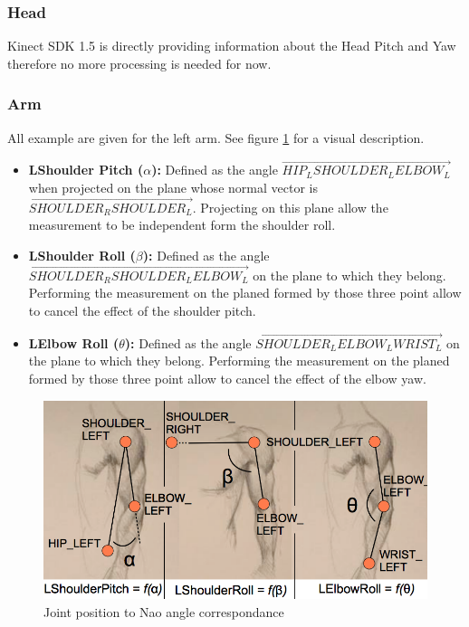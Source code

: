 \documentclass[a4paper,11pt]{article}
\begin{document}
\subsubsection*{Head}

Kinect SDK 1.5 is directly providing information about the Head Pitch and Yaw therefore no more processing is needed for now.

\subsubsection*{Arm}

All example are given for the left arm. See figure \ref{kinecttonao} for a visual description.

\begin{itemize}
\item \textbf{LShoulder Pitch ($\alpha$):} Defined as the angle $\vec{HIP_L SHOULDER_L ELBOW_L}$ when projected on the plane whose normal vector is $\vec{SHOULDER_R SHOULDER_L}$. Projecting on this plane allow the measurement to be independent form the shoulder roll.

\item \textbf{LShoulder Roll ($\beta$):} Defined as the angle $\vec{SHOULDER_R SHOULDER_L ELBOW_L}$ on the plane to which they belong. Performing the measurement on the planed formed by those three point allow to cancel the effect of the shoulder pitch.

\item \textbf{LElbow Roll ($\theta$):} Defined as the angle $\vec{SHOULDER_L ELBOW_L WRIST_L}$  on the plane to which they belong. Performing the measurement on the planed formed by those three point allow to cancel the effect of the elbow yaw.


\end{itemize}

\begin{figure}[H]
	\centering
	\includegraphics[width=12cm]{kinect_to_nao.png}
	\caption{Joint position to Nao angle correspondance}
	\label{kinecttonao}
\end{figure}
\end{document}
